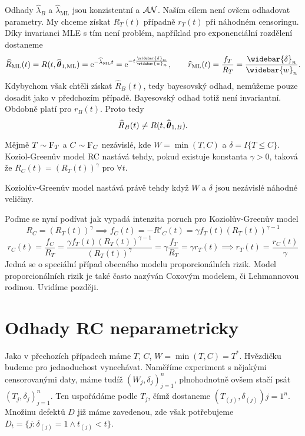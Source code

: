     Odhady $\widehat{\lambda}_{B}$ a $\widehat{\lambda}_\mathrm{ML}$ jsou konzistentní a $\mathcal{AN}$. Naším cílem není ovšem odhadovat parametry. My chceme získat $R_T(t)$ případně $r_T(t)$ při náhodném censoringu. Díky invarianci MLE s tím není problém, například pro exponenciální rozdělení dostaneme
    $$ \widehat{R}_\mathrm{ML}(t) = R(t, \widehat{\bt}_{1,\mathrm{ML}}) = \e{-\widehat{\lambda}_\mathrm{ML} t} = \e{-t\frac{\widebar{\delta}_n}{\widebar{w}_n}}, \qquad \widehat{r}_\mathrm{ML}(t) = \frac{f_T}{R_T} = \frac{\widebar{\delta}_n}{\widebar{w}_n}.$$
    Kdybychom však chtěli získat $\widehat{R}_{B}(t)$, tedy bayesovský odhad, nemůžeme pouze dosadit jako v předchozím případě. Bayesovský odhad totiž není invariantní. Obdobně platí pro $r_B(t)$. Proto tedy
    $$\widehat{R}_{B}(t) \neq  R(t, \widehat{\boldsymbol{\theta}}_{1,B}).$$

    \begin{define}
        Mějmě $T\sim \mathrm{F}_T$ a $C\sim \mathrm{F}_C$ nezávislé, kde $W = \min(T,C)$ a $\delta = I\lbrace T \leq C \rbrace$. Koziol-Greenův model RC nastává tehdy, pokud existuje konstanta $\gamma >0$, taková že $R_C(t) = (R_T(t))^{\gamma}$ pro $\forall t$. 
    \end{define}

    \begin{theorem}
        Koziolův-Greenův model nastává právě tehdy když $W$ a $\delta$ jsou nezávislé náhodné veličiny.
    \end{theorem}
    Poďme se nyní podívat jak vypadá intenzita poruch pro Koziolův-Greenův model
    $$ R_C = (R_T(t))^{\gamma} \implies f_C(t) = -R'_C(t) = \gamma f_T(t)(R_T(t))^{\gamma-1}$$
    $$r_C(t) =\frac{f_C}{R_T}=\frac{\gamma f_T(t)(R_T(t))^{\gamma-1}}{(R_T(t))^{\gamma}} = \gamma \frac{f_T}{R_T} = \gamma r_T(t) \implies r_T(t) = \frac{r_C(t)}{\gamma}$$
    Jedná se o speciální případ obecného modelu proporcionálních rizik. Model proporcionálních rizik je také často nazýván Coxovým modelem, či Lehmannovou rodinou.  Uvidíme později.

\section{Odhady RC neparametricky}

    Jako v přechozích případech máme $T$, $C$, $W=\min(T,C)=T^{*}$. Hvězdičku budeme pro jednoduchost vynechávat. Naměříme experiment s nějakými censorovanými daty, máme tudíž $(W_j,\delta_j)_{j=1}^n$, plnohodnotně ovšem stačí psát $(T_j,\delta_j)_{j=1}^n$. Ten uspořádáme podle $T_j$, čímž dostaneme $(T_{(j)}, \delta_{(j)}){j=1}^n$. 
    Množinu defektů $D$ již máme zavedenou, zde však potřebujeme $D_t =\lbrace j:\delta_{(j)}=1 \wedge t_{(j)} < t \rbrace$. 
    
